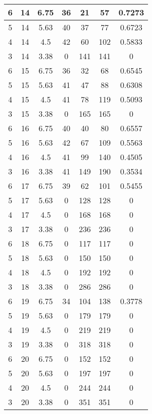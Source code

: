\documentclass[letterpaper, 12pt]{article}
\begin{document}
\begin{longtable}{|c|c|c|c|c|c|c|}
6 & 14 & 6.75 & 36 & 21 & 57 & 0.7273 \\
\hline
5 & 14 & 5.63 & 40 & 37 & 77 & 0.6723 \\
\hline
4 & 14 & 4.5 & 42 & 60 & 102 & 0.5833 \\
\hline
3 & 14 & 3.38 & 0 & 141 & 141 & 0 \\
\hline
6 & 15 & 6.75 & 36 & 32 & 68 & 0.6545 \\
\hline
5 & 15 & 5.63 & 41 & 47 & 88 & 0.6308 \\
\hline
4 & 15 & 4.5 & 41 & 78 & 119 & 0.5093 \\
\hline
3 & 15 & 3.38 & 0 & 165 & 165 & 0 \\
\hline
6 & 16 & 6.75 & 40 & 40 & 80 & 0.6557 \\
\hline
5 & 16 & 5.63 & 42 & 67 & 109 & 0.5563 \\
\hline
4 & 16 & 4.5 & 41 & 99 & 140 & 0.4505 \\
\hline
3 & 16 & 3.38 & 41 & 149 & 190 & 0.3534 \\
\hline
6 & 17 & 6.75 & 39 & 62 & 101 & 0.5455 \\
\hline
5 & 17 & 5.63 & 0 & 128 & 128 & 0 \\
\hline
4 & 17 & 4.5 & 0 & 168 & 168 & 0 \\
\hline
3 & 17 & 3.38 & 0 & 236 & 236 & 0 \\
\hline
6 & 18 & 6.75 & 0 & 117 & 117 & 0 \\
\hline
5 & 18 & 5.63 & 0 & 150 & 150 & 0 \\
\hline
4 & 18 & 4.5 & 0 & 192 & 192 & 0 \\
\hline
3 & 18 & 3.38 & 0 & 286 & 286 & 0 \\
\hline
6 & 19 & 6.75 & 34 & 104 & 138 & 0.3778 \\
\hline
5 & 19 & 5.63 & 0 & 179 & 179 & 0 \\
\hline
4 & 19 & 4.5 & 0 & 219 & 219 & 0 \\
\hline
3 & 19 & 3.38 & 0 & 318 & 318 & 0 \\
\hline
6 & 20 & 6.75 & 0 & 152 & 152 & 0 \\
\hline
5 & 20 & 5.63 & 0 & 197 & 197 & 0 \\
\hline
4 & 20 & 4.5 & 0 & 244 & 244 & 0 \\
\hline
3 & 20 & 3.38 & 0 & 351 & 351 & 0 \\
\hline
\end{longtable}
\end{document}
